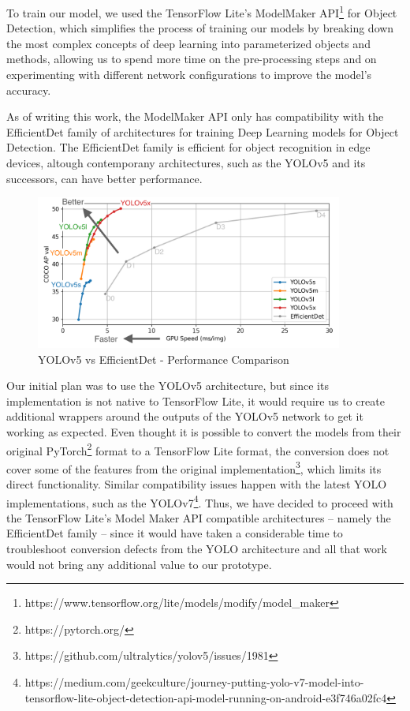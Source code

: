 \documentclass[openright]{normas-utf-tex} %
\begin{document}
To train our model, we used the TensorFlow Lite's ModelMaker API\footnote{https://www.tensorflow.org/lite/models/modify/model\_maker} 
for Object Detection, which simplifies the process of training our models by breaking down the most
complex concepts of deep learning into parameterized objects and methods, allowing us to spend
more time on the pre-processing steps and on experimenting with different network configurations
to improve the model's accuracy. 

As of writing this work, the ModelMaker API only has compatibility
with the EfficientDet family of architectures \cite{Mingxing2020} for training
Deep Learning models for Object Detection. The EfficientDet family is efficient
for object recognition in edge devices, altough contemporany architectures,
such as the YOLOv5 and its successors, can have better performance.

\begin{figure}[H]
	\centering
	\includegraphics[width=0.9\textwidth]{./images/yolo-efficientdet-comparison.png}
	\caption[YOLOv5 vs EfficientDet - Performance Comparison]{YOLOv5 vs EfficientDet - Performance Comparison}
    \label{fig:diff}
\end{figure}

Our initial plan was to use the YOLOv5 architecture, but since its
implementation is not native to TensorFlow Lite, it would require us to create
additional wrappers around the outputs of the YOLOv5 network to get it working
as expected. Even thought it is possible to convert the models from their
original PyTorch\footnote{https://pytorch.org/} format to a TensorFlow Lite
format, the conversion does not cover some of the features from the original
implementation\footnote{https://github.com/ultralytics/yolov5/issues/1981},
which limits its direct functionality. Similar compatibility issues happen with
the latest YOLO implementations, such as the
YOLOv7\footnote{https://medium.com/geekculture/journey-putting-yolo-v7-model-into-tensorflow-lite-object-detection-api-model-running-on-android-e3f746a02fc4}.
Thus, we have decided to proceed with the TensorFlow Lite's Model Maker API
compatible architectures -- namely the EfficientDet family --  since it would
have taken a considerable time to troubleshoot conversion defects from the YOLO
architecture and all that work would not bring any additional value to our
prototype.
\end{document}
